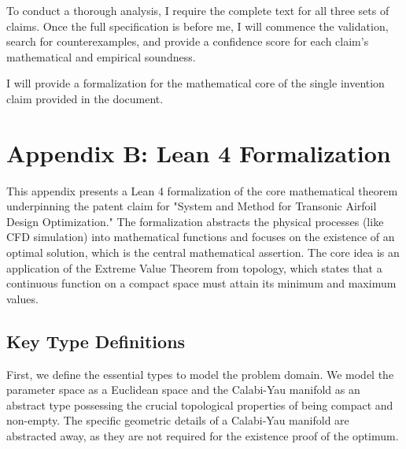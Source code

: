 \documentclass{article}
\begin{document}
To conduct a thorough analysis, I require the complete text for all three sets of claims. Once the full specification is before me, I will commence the validation, search for counterexamples, and provide a confidence score for each claim's mathematical and empirical soundness.


I will provide a formalization for the mathematical core of the single invention claim provided in the document.

\section*{Appendix B: Lean 4 Formalization}

This appendix presents a Lean 4 formalization of the core mathematical theorem underpinning the patent claim for "System and Method for Transonic Airfoil Design Optimization." The formalization abstracts the physical processes (like CFD simulation) into mathematical functions and focuses on the existence of an optimal solution, which is the central mathematical assertion. The core idea is an application of the Extreme Value Theorem from topology, which states that a continuous function on a compact space must attain its minimum and maximum values.

\subsection{Key Type Definitions}

First, we define the essential types to model the problem domain. We model the parameter space as a Euclidean space and the Calabi-Yau manifold as an abstract type possessing the crucial topological properties of being compact and non-empty. The specific geometric details of a Calabi-Yau manifold are abstracted away, as they are not required for the existence proof of the optimum.
\end{document}
